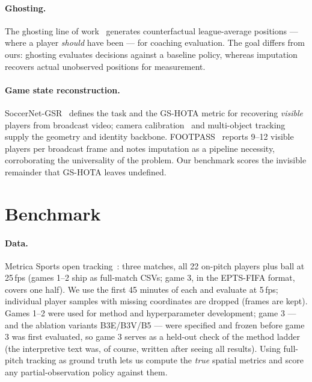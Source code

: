 \documentclass[11pt]{article}
\begin{document}
\paragraph{Ghosting.}
The ghosting line of work~\citep{le2017ghosting, yurko2024nflghosts} generates
counterfactual league-average positions --- where a player \emph{should} have
been --- for coaching evaluation. The goal differs from ours: ghosting evaluates
decisions against a baseline policy, whereas imputation recovers actual
unobserved positions for measurement.

\paragraph{Game state reconstruction.}
SoccerNet-GSR~\citep{somers2024soccernet} defines the task and the GS-HOTA
metric for recovering \emph{visible} players from broadcast video; camera
calibration~\citep{gutierrez2024pnlcalib, falaleev2024keypoints} and multi-object
tracking~\citep{aharon2022botsort} supply the geometry and identity backbone.
FOOTPASS~\citep{ochin2025footpass} reports 9--12 visible players per broadcast
frame and notes imputation as a pipeline necessity, corroborating the
universality of the problem. Our benchmark scores the invisible remainder that
GS-HOTA leaves undefined.

\section{Benchmark}
\label{sec:benchmark}

\paragraph{Data.}
Metrica Sports open tracking~\citep{metrica2020}: three matches, all 22
on-pitch players plus ball at 25\,fps (games 1--2 ship as full-match CSVs;
game 3, in the EPTS-FIFA format, covers one half). We use the first 45 minutes
of each and evaluate at 5\,fps; individual player samples with missing
coordinates are dropped (frames are kept). Games 1--2 were used for method and
hyperparameter development; game 3 --- and the ablation variants B3E/B3V/B5
--- were specified and frozen before game 3 was first evaluated, so game 3
serves as a held-out check of the method ladder (the interpretive text was, of
course, written after seeing all results). Using full-pitch tracking as ground truth lets us compute
the \emph{true} spatial metrics and score any partial-observation policy
against them.
\end{document}
